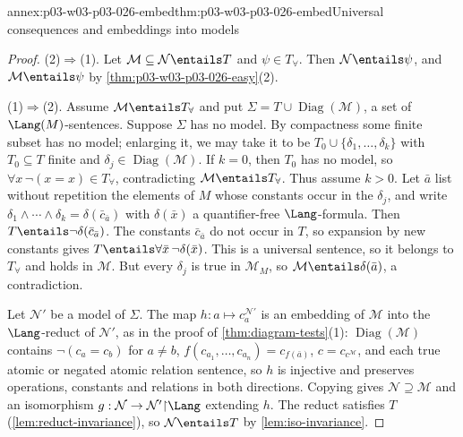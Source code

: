 \begin{annexitem}{annex:p03-w03-p03-026-embed}{thm:p03-w03-p03-026-embed}{Universal consequences and embeddings into models}
\begin{proof}
(2)\(\Rightarrow\)(1).  Let \(\mathcal M\subseteq\mathcal N\entails T\) and
\(\psi\in T_{\forall}\).  Then \(\mathcal N\entails\psi\), and
\(\mathcal M\entails\psi\) by \cref{thm:p03-w03-p03-026-easy}(2).

(1)\(\Rightarrow\)(2).  Assume \(\mathcal M\entails T_{\forall}\) and put
\(\Sigma=T\cup\operatorname{Diag}(\mathcal M)\), a set of
\(\Lang(M)\)-sentences.  Suppose \(\Sigma\) has no model.  By compactness
some finite subset has no model; enlarging it, we may take it to be
\(T_0\cup\{\delta_1,\ldots,\delta_k\}\) with \(T_0\subseteq T\) finite and
\(\delta_j\in\operatorname{Diag}(\mathcal M)\). If \(k=0\), then \(T_0\)
has no model, so \(\forall x\,\neg(x=x)\in T_\forall\), contradicting
\(\mathcal M\entails T_\forall\). Thus assume \(k>0\).
Let \(\bar a\) list without
repetition the elements of \(M\) whose constants occur in the
\(\delta_j\), and write
\(\delta_1\land\cdots\land\delta_k=\delta(\bar c_{\bar a})\) with
\(\delta(\bar x)\) a quantifier-free \(\Lang\)-formula.  Then \(T\entails\neg\delta(\bar c_{\bar a})\).
The constants \(\bar c_{\bar a}\) do not occur in \(T\), so expansion by new
constants gives \(T\entails\forall\bar x\,\neg\delta(\bar x)\).  This is a
universal sentence, so it belongs to \(T_{\forall}\) and holds in
\(\mathcal M\).  But every \(\delta_j\) is true in \(\mathcal M_M\), so
\(\mathcal M\entails\delta(\bar a)\), a contradiction.

Let \(\mathcal N'\) be a model of \(\Sigma\).  The map
\(h:a\mapsto c_a^{\mathcal N'}\) is an embedding of \(\mathcal M\) into the
\(\Lang\)-reduct of \(\mathcal N'\), as in the proof of
\cref{thm:diagram-tests}(1): \(\operatorname{Diag}(\mathcal M)\) contains
\(\neg(c_a=c_b)\) for \(a\neq b\), \(f(c_{a_1},\ldots,c_{a_n})=c_{f(\bar a)}\),
\(c=c_{c^{\mathcal M}}\), and each true atomic or negated atomic relation
sentence, so \(h\) is injective and preserves operations, constants and
relations in both directions.  Copying gives \(\mathcal N\supseteq\mathcal M\) and an
isomorphism \(g:\mathcal N\to\mathcal N'{\restriction}\Lang\) extending
\(h\).  The reduct satisfies \(T\) (\cref{lem:reduct-invariance}), so
\(\mathcal N\entails T\) by \cref{lem:iso-invariance}.
\end{proof}
\end{annexitem}

